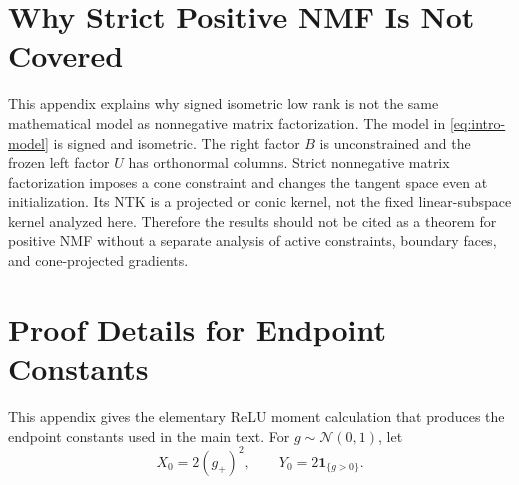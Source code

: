 \documentclass{article}
\newcommand{\one}{\mathbf 1}
\begin{document}
\section{Why Strict Positive NMF Is Not Covered}
This appendix explains why signed isometric low rank is not the same mathematical model as nonnegative matrix factorization.
The model in \eqref{eq:intro-model} is signed and isometric. The right factor \(B\) is unconstrained and the frozen left factor \(U\) has orthonormal columns. Strict nonnegative matrix factorization imposes a cone constraint and changes the tangent space even at initialization. Its NTK is a projected or conic kernel, not the fixed linear-subspace kernel analyzed here. Therefore the results should not be cited as a theorem for positive NMF without a separate analysis of active constraints, boundary faces, and cone-projected gradients.

\section{Proof Details for Endpoint Constants}
\label{app:proof-endpoint-constants}
This appendix gives the elementary ReLU moment calculation that produces the endpoint constants used in the main text. For \(g\sim\mathcal N(0,1)\), let
\[
X_0=2(g_+)^2,
\qquad
Y_0=2\one_{\{g>0\}}.
\]
\end{document}

